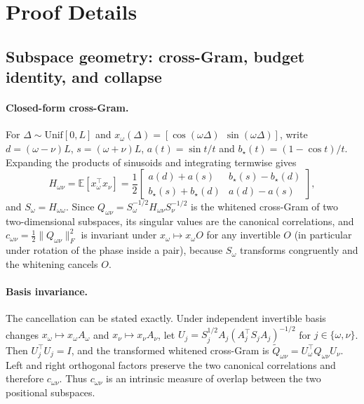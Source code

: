 \section{Proof Details}
\label{sec:proofs}

\FloatBarrier
\subsection{Subspace geometry: cross-Gram, budget identity, and collapse}
\label{sec:geometry-proofs}

\paragraph{Closed-form cross-Gram.} For $\Delta\sim\mathrm{Unif}[0,L]$ and
$x_\omega(\Delta)=[\cos(\omega\Delta)\ \ \sin(\omega\Delta)]$, write
$d=(\omega{-}\nu)L$, $s=(\omega{+}\nu)L$, $a(t)=\sin t/t$ and
$b_\star(t)=(1{-}\cos t)/t$. Expanding the products of sinusoids and integrating
termwise gives
\begin{equation}
H_{\omega\nu}=\mathbb E[x_\omega^\top x_\nu]=\frac12
\begin{bmatrix}
a(d)+a(s) & b_\star(s)-b_\star(d)\\
b_\star(s)+b_\star(d) & a(d)-a(s)
\end{bmatrix},
\label{eq:cross-gram}
\end{equation}
and $S_\omega=H_{\omega\omega}$. Since $Q_{\omega\nu}=S_\omega^{-1/2}H_{\omega\nu}S_\nu^{-1/2}$
is the whitened cross-Gram of two two-dimensional subspaces, its singular values
are the canonical correlations, and $c_{\omega\nu}=\frac12\|Q_{\omega\nu}\|_F^2$
is invariant under $x_\omega\mapsto x_\omega O$ for any invertible $O$ (in
particular under rotation of the phase inside a pair), because $S_\omega$
transforms congruently and the whitening cancels $O$.

\paragraph{Basis invariance.}
The cancellation can be stated exactly. Under independent invertible basis
changes $x_\omega\mapsto x_\omega A_\omega$ and
$x_\nu\mapsto x_\nu A_\nu$, let
$U_j=S_j^{1/2}A_j(A_j^\top S_j A_j)^{-1/2}$ for $j\in\{\omega,\nu\}$. Then
$U_j^\top U_j=I$, and the transformed whitened cross-Gram is
$\widetilde Q_{\omega\nu}=U_\omega^\top Q_{\omega\nu}U_\nu$. Left and right
orthogonal factors preserve the two canonical correlations and therefore
$c_{\omega\nu}$. Thus $c_{\omega\nu}$ is an intrinsic measure of overlap
between the two positional subspaces.


